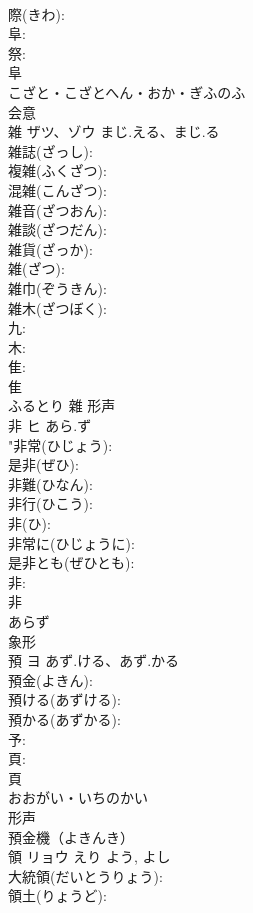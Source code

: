 \documentclass[8pt]{extreport}
\begin{document}
\begin{CJK}{UTF8}{min}
\\	際(きわ): 
\\	阜: 
\\	祭: 
\\	阜	
\\	こざと・こざとへん・おか・ぎふのふ	
\\	会意 
\\	雑	ザツ、ゾウ	まじ.える、まじ.る		
\\	雑誌(ざっし): 
\\	複雑(ふくざつ): 
\\	混雑(こんざつ): 
\\	雑音(ざつおん): 
\\	雑談(ざつだん): 
\\	雑貨(ざっか): 
\\	雑(ざつ): 
\\	雑巾(ぞうきん): 
\\	雑木(ざつぼく): 
\\	九: 
\\	木: 
\\	隹: 
\\	隹	
\\	ふるとり	雜	形声 
\\	非	ヒ	あら.ず		
\\	"非常(ひじょう): 
\\	是非(ぜひ): 
\\	非難(ひなん): 
\\	非行(ひこう): 
\\	非(ひ): 
\\	非常に(ひじょうに): 
\\	是非とも(ぜひとも): 
\\	非: 
\\	非	
\\	あらず	
\\	象形 
\\	預	ヨ	あず.ける、あず.かる		
\\	預金(よきん): 
\\	預ける(あずける): 
\\	預かる(あずかる): 
\\	予: 
\\	頁: 
\\	頁	
\\	おおがい・いちのかい	
\\	形声 
\\	預金機（よきんき）
\\	領	リョウ	えり	よう, よし	
\\	大統領(だいとうりょう): 
\\	領土(りょうど): 

\end{CJK}
\end{document}
